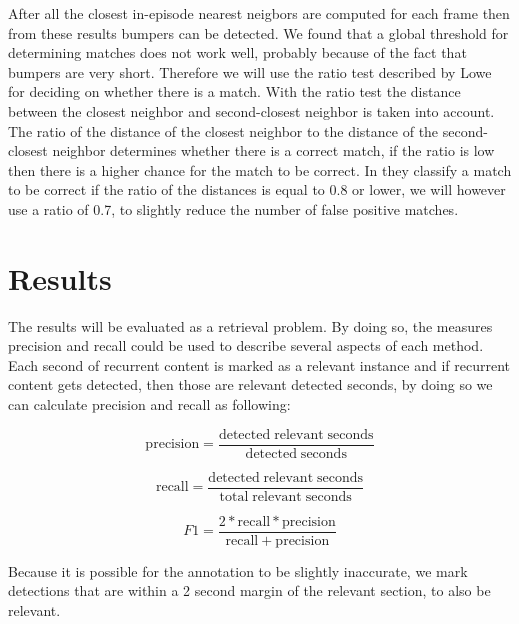 \documentclass{article}
\begin{document}
After all the closest in-episode nearest neigbors are computed for each frame then from these results bumpers can be detected. We found that a global threshold for determining matches does not work well, probably because of the fact that bumpers are very short. Therefore we will use the ratio test described by Lowe \cite{lowe2004distinctive} for deciding on whether there is a match. With the ratio test the distance between the closest neighbor and second-closest neighbor is taken into account. The ratio of the distance of the closest neighbor to the distance of the second-closest neighbor determines whether there is a correct match, if the ratio is low then there is a higher chance for the match to be correct. In \cite{lowe2004distinctive} they classify a match to be correct if the ratio of the distances is equal to 0.8 or lower, we will however use a ratio of 0.7, to slightly reduce the number of false positive matches.



\section{Results} \label{results}

The results will be evaluated as a retrieval problem. By doing so, the measures precision and recall could be used to describe several aspects of each method. Each second of recurrent content is marked as a relevant instance and if recurrent content gets detected, then those are relevant detected seconds, by doing so we can calculate precision and recall as following:

\[\mathrm{precision} = \frac{\mathrm{detected\;relevant\;seconds}}{\mathrm{detected\;seconds}}\]

\[\mathrm{recall} = \frac{\mathrm{detected\;relevant\;seconds}}{\mathrm{total\;relevant\;seconds}}\]

\[F1 = \frac{2*\mathrm{recall} * \mathrm{precision}}{\mathrm{recall} + \mathrm{precision}}\]

Because it is possible for the annotation to be slightly inaccurate, we mark detections that are within a 2 second margin of the relevant section, to also be relevant.
\end{document}
